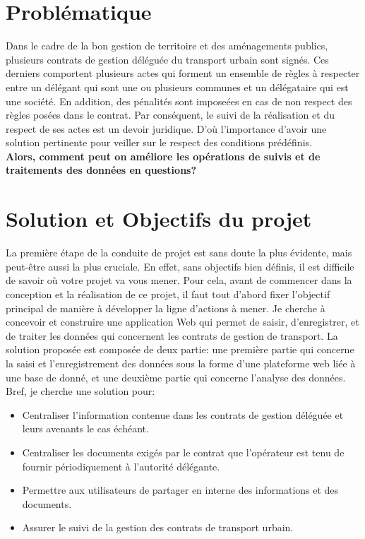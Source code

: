 \documentclass[a4paper]{report}
\begin{document}
\begin{doublespace}
    \section{Problématique}
    Dans le cadre de la bon gestion de territoire et des aménagements publics, plusieurs
    contrats de gestion déléguée du transport urbain sont signés. Ces derniers comportent
    plusieurs actes qui forment un ensemble de règles à respecter entre un délégant qui
    sont une ou plusieurs communes et un délégataire qui est une société. En addition,
    des pénalités sont imposeées en cas de non respect des règles posées dans le contrat.
    Par conséquent, le suivi de la réalisation et du respect de ses actes est un devoir
    juridique. D’où l'importance d'avoir une solution pertinente pour veiller sur le
    respect des conditions prédéfinis.
    \\\textbf{Alors, comment peut on améliore les opérations de suivis et de traitements des données en questions?}
    \section{Solution et Objectifs du projet}
    La première étape de la conduite de projet est sans doute la plus évidente, mais peut-être
    aussi la plus cruciale. En effet, sans objectifs bien définis, il est difficile de savoir où votre projet
    va vous mener. Pour cela, avant de commencer dans la conception et la réalisation de ce projet,
    il faut tout d’abord fixer l’objectif principal de manière à développer la ligne d’actions à mener.
    Je cherche à concevoir et construire une application Web qui permet de saisir, d'enregistrer,
    et de traiter les données qui concernent les contrats de gestion de transport. La
    solution proposée est composée de deux partie: une première partie qui concerne la
    saisi et l'enregistrement des données sous la forme d'une plateforme web liée à une
    base de donné, et une deuxième partie qui concerne l'analyse des données.
    Bref, je cherche une solution pour:
    \begin{itemize}
        \item Centraliser l’information contenue dans les contrats de gestion déléguée et
              leurs avenants le cas échéant.
        \item Centraliser les documents exigés par le contrat que l’opérateur est tenu de
              fournir périodiquement à l’autorité délégante.
        \item Permettre aux utilisateurs de partager en interne des informations et des
              documents.
        \item Assurer le suivi de la gestion des contrats de transport urbain.
    \end{itemize}
    \newpage

\end{doublespace}
\end{document}
